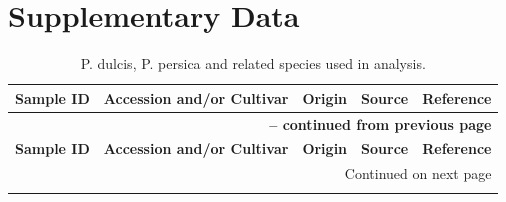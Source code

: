 \documentclass[12pt]{article}
\begin{document}
\section*{Supplementary Data}
\begin{center}
\begin{longtable}{lllll}
\caption[P. dulcis, P. persica and related species used in analysis.]{P. dulcis, P. persica and related species used in analysis.} \label{my-label} \\
\hline \hline \multicolumn{1}{l}{\textbf{Sample ID}} &
\multicolumn{1}{l}{\textbf{Accession and/or Cultivar}} &
\multicolumn{1}{l}{\textbf{Origin}} &
\multicolumn{1}{l}{\textbf{Source}}  &
\multicolumn{1}{c}{\textbf{Reference}} \\ \hline 
\endfirsthead

\multicolumn{5}{r}{{\bfseries \tablename\ \thetable{} -- continued from previous page}} \\
\hline \multicolumn{1}{l}{\textbf{Sample ID}} &
\multicolumn{1}{l}{\textbf{Accession and/or Cultivar}} &
\multicolumn{1}{l}{\textbf{Origin}} &
\multicolumn{1}{l}{\textbf{Source}} &
\multicolumn{1}{c}{\textbf{Reference}} \\ \hline 
\endhead

\hline \multicolumn{5}{r}{{Continued on next page}} \\ \hline
\endfoot

\hline \hline
\endlastfoot


\end{longtable}
\end{center}
\end{document}
